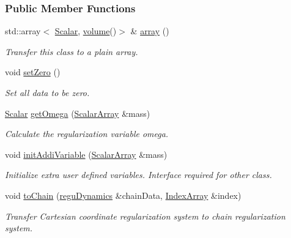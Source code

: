 \subsubsection*{Public Member Functions}
\begin{DoxyCompactItemize}
\item 
std\+::array$<$ \mbox{\hyperlink{classregu_dynamics_a359c55370b4dee032396f0df86ad5fab}{Scalar}}, \mbox{\hyperlink{classregu_dynamics_a3a00b2009ce88898871ca024c30c6882}{volume}}()$>$ \& \mbox{\hyperlink{classregu_dynamics_aa1c12cfc524f02a52590b2659db79795}{array}} ()
\begin{DoxyCompactList}\small\item\em Transfer this class to a plain array. \end{DoxyCompactList}\item 
void \mbox{\hyperlink{classregu_dynamics_a50e6ec7efc990c325d3694e225f04194}{set\+Zero}} ()
\begin{DoxyCompactList}\small\item\em Set all data to be zero. \end{DoxyCompactList}\item 
\mbox{\hyperlink{classregu_dynamics_a359c55370b4dee032396f0df86ad5fab}{Scalar}} \mbox{\hyperlink{classregu_dynamics_a0fe3b4f9a468687ec1f004120b347ddd}{get\+Omega}} (\mbox{\hyperlink{classregu_dynamics_a34b4b77ea3e49e1cdef584ec8bd281dc}{Scalar\+Array}} \&mass)
\begin{DoxyCompactList}\small\item\em Calculate the regularization variable omega. \end{DoxyCompactList}\item 
void \mbox{\hyperlink{classregu_dynamics_aa42158ddf3c5385aa89988b9bb80ff29}{init\+Addi\+Variable}} (\mbox{\hyperlink{classregu_dynamics_a34b4b77ea3e49e1cdef584ec8bd281dc}{Scalar\+Array}} \&mass)
\begin{DoxyCompactList}\small\item\em Initialize extra user defined variables. Interface required for other class. \end{DoxyCompactList}\item 
void \mbox{\hyperlink{classregu_dynamics_aae4e77bbbb00f0bdddb396047f1c0fc2}{to\+Chain}} (\mbox{\hyperlink{classregu_dynamics}{regu\+Dynamics}} \&chain\+Data, \mbox{\hyperlink{classregu_dynamics_a2c9fa7372e4a11be9d85728b4a0e455f}{Index\+Array}} \&index)
\begin{DoxyCompactList}\small\item\em Transfer Cartesian coordinate regularization system to chain regularization system. \end{DoxyCompactList}\item 

\end{DoxyCompactItemize}
